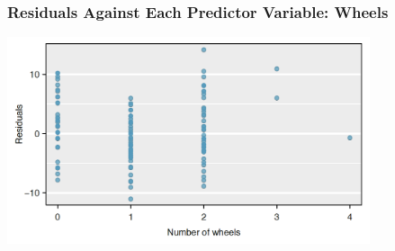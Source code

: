 \documentclass[handout]{beamer}
\newcommand{\blue}[1]{\textcolor{blue2}{#1}}
\begin{document}
\begin{frame}[fragile]
\frametitle{Residuals Against Each Predictor Variable: Wheels}

\begin{center}
\includegraphics[width=0.8\textwidth]{figure/pred2.png}
\end{center}

\end{frame}


%
%
%
%
%
%
%
%
\end{document}
